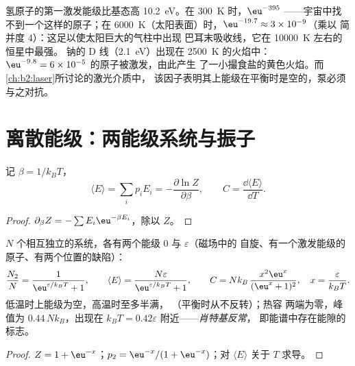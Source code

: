 \begin{example}[原子能级的粒子数]\label{ex:b2:boltzmann-factor:levels}
氢原子的第一激发能级比基态高
\qty{10.2}{eV}。在 \qty{300}{K} 时，$\eu^{-395}$ ——宇宙中找不到一个这样的原子；在
\qty{6000}{K}（太阳表面）时，$\eu^{-19.7} \approx 3 \times 10^{-9}$（乘以
简并度 $4$）：这足以使太阳巨大的气柱中出现
巴耳末吸收线，它在 \qty{10000}{K} 左右的恒星中最强。
钠的 D 线（\qty{2.1}{eV}）出现在 \qty{2500}{K} 的火焰中：$\eu^{-9.8} = 6
\times 10^{-5}$ 的原子被激发，由此产生
了一小撮食盐的黄色火焰。而\cref{ch:b2:laser}所讨论的激光介质中，
该因子表明其上能级在平衡时是空的，泵必须
与之对抗。
\end{example}

\section{离散能级：两能级系统与振子}

\begin{proposition}[配分函数给出的平均能量]\label{prop:b2:boltzmann-factor:meanE}
记 $\beta = 1/k_BT$，
\[
\langle E\rangle = \sum_ip_iE_i = -\frac{\partial\ln Z}{\partial\beta}, \qquad
C = \frac{\dd\langle E\rangle}{\dd T} .
\]
\end{proposition}

\begin{proof}
$\partial_\beta Z = -\sum E_i\eu^{-\beta E_i}$，除以 $Z$。
\end{proof}

\begin{proposition}[两能级系统]\label{prop:b2:boltzmann-factor:twolevel}
$N$ 个相互独立的系统，各有两个能级 $0$ 与 $\varepsilon$（磁场中的
自旋、有一个激发能级的原子、有两个位置的缺陷）：
\[
\frac{N_2}{N} = \frac{1}{\eu^{\varepsilon/k_BT} + 1}, \qquad
\langle E\rangle = \frac{N\varepsilon}{\eu^{\varepsilon/k_BT} + 1}, \qquad
C = Nk_B\,\frac{x^2\eu^x}{(\eu^x + 1)^2}, \quad x = \frac{\varepsilon}{k_BT} .
\]
低温时上能级为空，高温时至多半满，
（平衡时从不反转）；热容
两端为零，峰值为 $0.44\,Nk_B$，出现在 $k_BT = 0.42
\varepsilon$ 附近——\emph{肖特基反常}，
即能谱中存在能隙的标志。
\end{proposition}

\begin{proof}
$Z = 1 + \eu^{-x}$；$p_2 = \eu^{-x}/(1 + \eu^{-x})$；对 $\langle
E\rangle$ 关于 $T$ 求导。
\end{proof}

